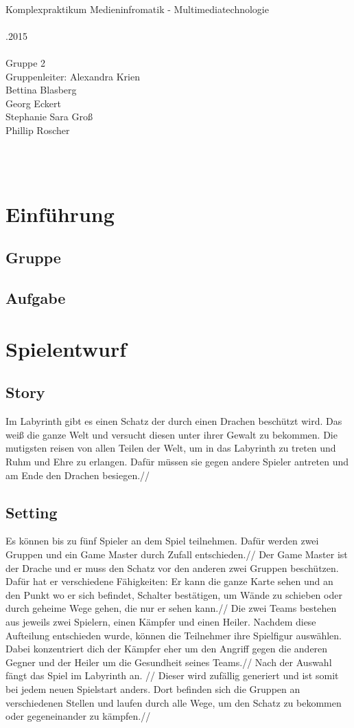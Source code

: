 \documentclass[10pt,a4paper,notitlepage]{report}
\author{Group2}
\begin{document}
\\
		{\large Komplexpraktikum Medieninfromatik - Multimediatechnologie\\}
\
\\
.2015\\\
\\
\centering 	Gruppe 2\\
		Gruppenleiter: Alexandra Krien\\
		Bettina Blasberg\\
		Georg Eckert\\
		Stephanie Sara Groß\\
		Phillip Roscher\\\

\tableofcontents
\clearpage\
\\
\begin{flushleft}
\chapter[Einführung]{Einführung}
\section{Gruppe}
\section{Aufgabe}

\chapter{Spielentwurf}
\section{Story}
Im Labyrinth gibt es einen Schatz der durch einen Drachen beschützt wird. Das weiß die ganze Welt und versucht diesen unter ihrer Gewalt zu bekommen. Die mutigsten reisen von allen Teilen der Welt, um in das Labyrinth zu treten und Ruhm und Ehre zu erlangen. Dafür müssen sie gegen andere Spieler antreten und am Ende den Drachen besiegen.//
\section{Setting}
Es können bis zu fünf Spieler an dem Spiel teilnehmen. Dafür werden zwei Gruppen und ein Game Master durch Zufall entschieden.//
Der Game Master ist der Drache und er muss den Schatz vor den anderen zwei Gruppen beschützen. Dafür hat er verschiedene Fähigkeiten: Er kann die ganze Karte sehen und an den Punkt wo er sich befindet, Schalter bestätigen, um Wände zu schieben oder durch geheime Wege gehen, die nur er sehen kann.//
Die zwei Teams bestehen aus jeweils zwei Spielern, einen Kämpfer und einen Heiler. Nachdem diese Aufteilung entschieden wurde, können die Teilnehmer ihre Spielfigur auswählen. Dabei konzentriert dich der Kämpfer eher um den Angriff gegen die anderen Gegner und der Heiler um die Gesundheit seines Teams.//
Nach der Auswahl fängt das Spiel im Labyrinth an. //
Dieser wird zufällig generiert und ist somit bei jedem neuen Spielstart anders. Dort befinden sich die Gruppen an verschiedenen Stellen und laufen durch alle Wege, um den Schatz zu bekommen oder gegeneinander zu kämpfen.//

\end{flushleft}
\end{document}

